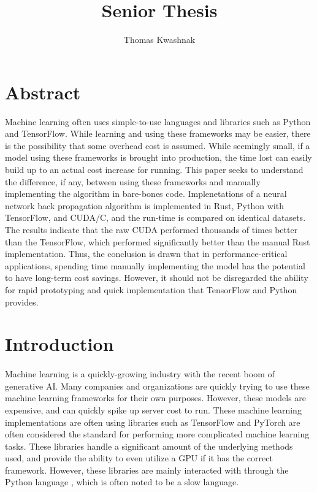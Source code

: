 \documentclass[12pt]{article}
\author{Thomas Kwashnak}
\title{Senior Thesis}
\newcommand{\CC}{C\nolinebreak\hspace{-.05em}\raisebox{.4ex}{\tiny\bf +}\nolinebreak\hspace{-.10em}\raisebox{.4ex}{\tiny\bf + }}
\begin{document}
\maketitle

\newpage

\section{Abstract}

Machine learning often uses simple-to-use languages and libraries such as Python and TensorFlow.
While learning and using these frameworks may be easier, there is the possibility that some overhead cost is assumed.
While seemingly small, if a model using these frameworks is brought into production, the time lost can easily build up to an actual cost increase for running.
This paper seeks to understand the difference, if any, between using these frameworks and manually implementing the algorithm in bare-bones code.
Implenetations of a neural network back propagation algorithm is implemented in Rust, Python with TensorFlow, and CUDA/\CC, and the run-time is compared on identical datasets.
The results indicate that the raw CUDA performed thousands of times better than the TensorFlow, which performed significantly better than the manual Rust implementation.
Thus, the conclusion is drawn that in performance-critical applications, spending time manually implementing the model has the potential to have long-term cost savings.
However, it should not be disregarded the ability for rapid prototyping and quick implementation that TensorFlow and Python provides.


\section{Introduction}

\paragraph{}
Machine learning is a quickly-growing industry with the recent boom of generative AI.
Many companies and organizations are quickly trying to use these machine learning frameworks for their own purposes.
However, these models are expensive, and can quickly spike up server cost to run.
These machine learning implementations are often using libraries such as TensorFlow \cite{lib_tensorflow} and PyTorch \cite{lib_pytorch} are often considered the standard for performing more complicated machine learning tasks.
These libraries handle a significant amount of the underlying methods used, and provide the ability to even utilize a GPU if it has the correct framework.
However, these libraries are mainly interacted with through the Python language \cite{lang_python}, which is often noted to be a slow language.
\end{document}
